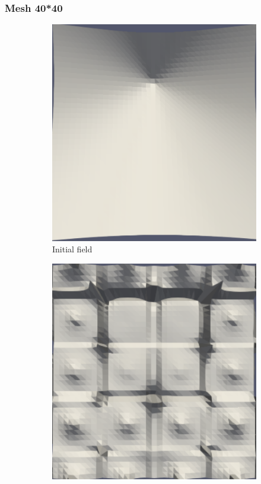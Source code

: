 \documentclass{article}
\begin{document}
\subsubsection{Mesh 40*40}
\begin{figure}[hbt!]
  \begin{subfigure}{0.4\textwidth}
        \centering
        \includegraphics[width=\textwidth]{Figures/e-5 40x40/for n 1.png}
        \caption{Initial field}
  \end{subfigure}
  \hfill
  \begin{subfigure}{0.4\textwidth}
        \centering
        \includegraphics[width=\textwidth]{Figures/e-5 40x40/for n 100.png}

\end{subfigure}
\end{figure}
\end{document}
